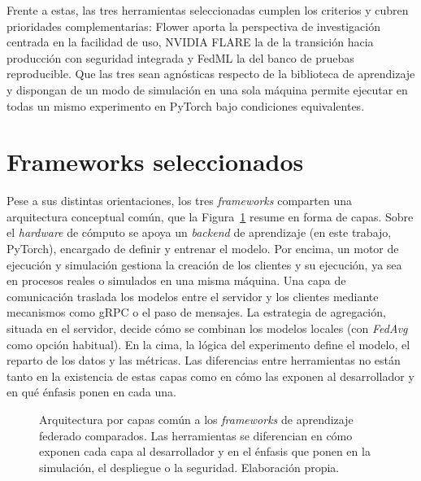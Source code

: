 Frente a estas, las tres herramientas seleccionadas cumplen los criterios y cubren
prioridades complementarias: Flower aporta la perspectiva de investigación centrada en la
facilidad de uso, NVIDIA FLARE la de la transición hacia producción con seguridad
integrada y FedML la del banco de pruebas reproducible. Que las tres sean agnósticas
respecto de la biblioteca de aprendizaje y dispongan de un modo de simulación en una sola
máquina permite ejecutar en todas un mismo experimento en PyTorch bajo condiciones
equivalentes.

\section{Frameworks seleccionados}\label{sec:frameworks-seleccionados}

Pese a sus distintas orientaciones, los tres \textit{frameworks} comparten una
arquitectura conceptual común, que la Figura~\ref{fig:arquitectura-frameworks} resume en
forma de capas. Sobre el \textit{hardware} de cómputo se apoya un \textit{backend} de
aprendizaje (en este trabajo, PyTorch), encargado de definir y entrenar el modelo. Por
encima, un motor de ejecución y simulación gestiona la creación de los clientes y su
ejecución, ya sea en procesos reales o simulados en una misma máquina. Una capa de
comunicación traslada los modelos entre el servidor y los clientes mediante mecanismos
como gRPC o el paso de mensajes. La estrategia de agregación, situada en el servidor,
decide cómo se combinan los modelos locales (con \textit{FedAvg} como opción habitual). En
la cima, la lógica del experimento define el modelo, el reparto de los datos y las
métricas. Las diferencias entre herramientas no están tanto en la existencia de estas
capas como en cómo las exponen al desarrollador y en qué énfasis ponen en cada una.

\begin{figure}[htbp]
  \centering
  \caption{Arquitectura por capas común a los \textit{frameworks} de aprendizaje
  federado comparados. Las herramientas se diferencian en cómo exponen cada capa al
  desarrollador y en el énfasis que ponen en la simulación, el despliegue o la seguridad.
  Elaboración propia.}
  \label{fig:arquitectura-frameworks}
\end{figure}

